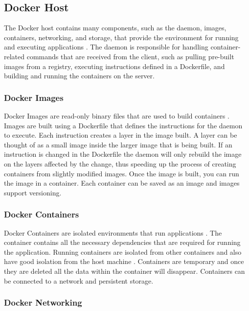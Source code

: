 \documentclass[fleqn,12pt]{olplainarticle}
\begin{document}
\subsection{Docker Host}

The Docker host contains many components, such as the daemon, images, containers, networking, and storage, that provide the environment for running and executing applications \citep{aquasec:docker_architecture}. The daemon is responsible for handling container-related commands that are received from the client, such as pulling pre-built images from a registry, executing instructions defined in a Dockerfile, and building and running the containers on the server.

\subsubsection{Docker Images}

Docker Images are read-only binary files that are used to build containers \citep{docker:overview}. Images are built using a Dockerfile that defines the instructions for the daemon to execute. Each instruction creates a layer in the image built. A layer can be thought of as a small image inside the larger image that is being built. If an instruction is changed in the Dockerfile the daemon will only rebuild the image on the layers affected by the change, thus speeding up the process of creating containers from slightly modified images. Once the image is built, you can run the image in a container. Each container can be saved as an image and images support versioning.

\subsubsection{Docker Containers}

Docker Containers are isolated environments that run applications \citep{aquasec:docker_architecture}. The container contains all the necessary dependencies that are required for running the application. Running containers are isolated from other containers and also have good isolation from the host machine \citep{docker:security}. Containers are temporary and once they are deleted all the data within the container will disappear. Containers can be connected to a network and persistent storage.

\subsubsection{Docker Networking}
\end{document}
